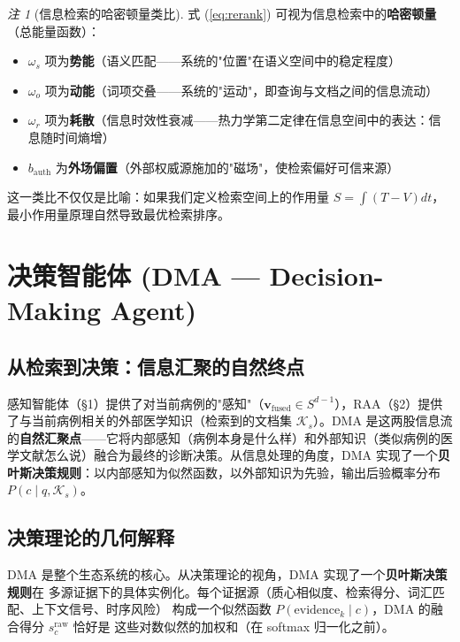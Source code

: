 \documentclass[11pt,a4paper]{ctexart}
\theoremstyle{remark}
\newtheorem{remark}{注}[section]
\begin{document}
\begin{remark}[信息检索的哈密顿量类比]
式 (\ref{eq:rerank}) 可视为信息检索中的\textbf{哈密顿量}（总能量函数）：
\begin{itemize}[nosep]
\item $\omega_s$ 项为\textbf{势能}（语义匹配——系统的"位置"在语义空间中的稳定程度）
\item $\omega_o$ 项为\textbf{动能}（词项交叠——系统的"运动"，即查询与文档之间的信息流动）
\item $\omega_r$ 项为\textbf{耗散}（信息时效性衰减——热力学第二定律在信息空间中的表达：信息随时间熵增）
\item $b_{\text{auth}}$ 为\textbf{外场偏置}（外部权威源施加的"磁场"，使检索偏好可信来源）
\end{itemize}
这一类比不仅仅是比喻：如果我们定义检索空间上的作用量 $S = \int (T - V) dt$，
最小作用量原理自然导致最优检索排序。
\end{remark}

\section{决策智能体 (DMA — Decision-Making Agent)}

\subsection{从检索到决策：信息汇聚的自然终点}

感知智能体（§1）提供了对当前病例的"感知"（$\mathbf{v}_{\text{fused}} \in S^{d-1}$），RAA（§2）提供了与当前病例相关的外部医学知识（检索到的文档集 $\mathcal{K}_s$）。DMA 是这两股信息流的\textbf{自然汇聚点}——它将内部感知（病例本身是什么样）和外部知识（类似病例的医学文献怎么说）融合为最终的诊断决策。从信息处理的角度，DMA 实现了一个\textbf{贝叶斯决策规则}：以内部感知为似然函数，以外部知识为先验，输出后验概率分布 $P(c \mid q, \mathcal{K}_s)$。

\subsection{决策理论的几何解释}

DMA 是整个生态系统的核心。从决策理论的视角，DMA 实现了一个\textbf{贝叶斯决策规则}在
多源证据下的具体实例化。每个证据源（质心相似度、检索得分、词汇匹配、上下文信号、时序风险）
构成一个似然函数 $P(\text{evidence}_k \mid c)$，DMA 的融合得分 $s_c^{\text{raw}}$ 恰好是
这些对数似然的加权和（在 softmax 归一化之前）。
\end{document}
